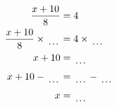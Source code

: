 \documentclass[12pt]{article}
\begin{document}
\begin{multicols}{2}
\begin{minipage}[t]{0.45\textwidth}
    \raggedright %
    \begin{align*} %
        \frac{x + 10}{8} &= 4\\
        \frac{x + 10}{8} \times\dotuline{\hspace{5mm}} &= 4 \times\dotuline{\hspace{5mm}}\\
        x + 10 &= \dotuline{\hspace{5mm}}\\
        x + 10 - \dotuline{\hspace{5mm}} &= \dotuline{\hspace{5mm}} - \dotuline{\hspace{5mm}}\\
        x &= \dotuline{\hspace{5mm}}\\
    \end{align*}
\end{minipage}\newpage
    
\end{multicols}
\end{document}
